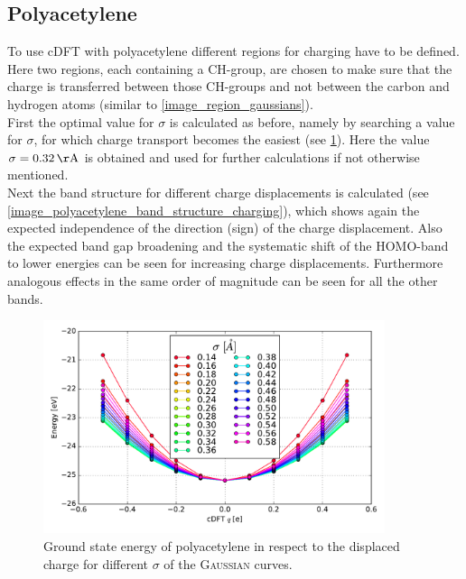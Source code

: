 \subsection{Polyacetylene}
To use cDFT with polyacetylene different regions for charging have to be defined. Here two regions, each containing a CH-group, are chosen to make sure that the charge is transferred between those CH-groups and not between the carbon and hydrogen atoms (similar to \cref{image_region_gaussians}).\\
First the optimal value for $\sigma$ is calculated as before, namely by searching a value for $\sigma$, for which charge transport becomes the easiest (see \cref{image_sigmas_polyacetylene}). Here the value $\sigma = \unit[0.32]{\AA}$ is obtained and used for further calculations if not otherwise mentioned.\\
Next the band structure for different charge displacements is calculated (see \cref{image_polyacetylene_band_structure_charging}), which shows again the expected independence of the direction (sign) of the charge displacement. Also the expected band gap broadening and the systematic shift of the HOMO-band to lower energies can be seen for increasing charge displacements. Furthermore analogous effects in the same order of magnitude can be seen for all the other bands.\\
\begin{figure}
	\centering
	\includegraphics[width = 10cm]{Images/polyacetylene/charging/sigmas}
	\caption{Ground state energy of polyacetylene in respect to the displaced charge for different $\sigma$ of the \textsc{Gaussian} curves.}
	\label{image_sigmas_polyacetylene}
\end{figure}
